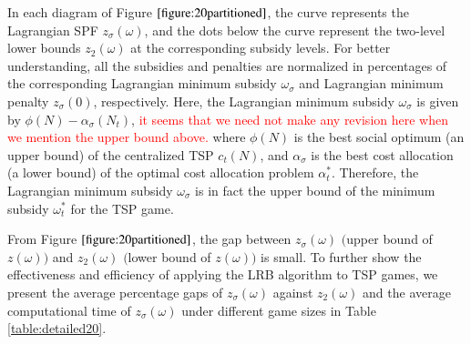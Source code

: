 \documentclass[authoryear,review,12pt]{elsarticle}
\begin{document}
In each diagram of Figure $\ref{figure:20partitioned}$, the curve represents the Lagrangian SPF $z_{\sigma}(\omega)$, and the dots below the curve represent the two-level lower bounds $z_{2}(\omega)$ at the corresponding subsidy levels.
For better understanding, all the subsidies and penalties are normalized in percentages of the corresponding Lagrangian minimum subsidy $\omega_{\sigma}$ and Lagrangian minimum penalty $z_{\sigma}(0)$, respectively.
Here, the Lagrangian minimum subsidy $\omega_{\sigma}$ is given by $\phi(N) - \alpha_{\sigma}(N_t)$, \textcolor{red}{
it seems that we need not make any revision here when we mention the upper bound above.} where $\phi(N)$ is the best social optimum (an upper bound) of the centralized TSP $c_t(N)$, and $\alpha_{\sigma}$ is the best cost allocation (a lower bound) of the optimal cost allocation problem $\alpha_t^*$.
Therefore, the Lagrangian minimum subsidy $\omega_{\sigma}$ is in fact the upper bound of the minimum subsidy $\omega_t^*$ for the TSP game.


From Figure $\ref{figure:20partitioned}$, the gap between $z_{\sigma}(\omega)$ $\big($upper bound of $z(\omega)$$\big)$ and $z_2(\omega)$ $\big($lower bound of $z(\omega)$$\big)$ is small.
To further show the effectiveness and efficiency of applying the LRB algorithm to TSP games, we present the average percentage gaps of $z_{\sigma}(\omega)$ against $z_2(\omega)$ and the average computational time of $z_{\sigma}(\omega)$ under different game sizes in Table \ref{table:detailed20}.
\end{document}
